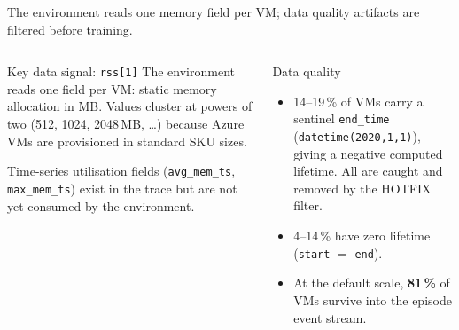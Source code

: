\documentclass[11pt,aspectratio=43]{beamer}
\begin{document}
\begin{frame}{The environment reads one memory field per VM; data quality artifacts are filtered before training.}

  \begin{columns}[T,onlytextwidth]
      \begin{block}{Key data signal: \texttt{rss[1]}}
        The environment reads one field per VM: static memory allocation in MB.
        Values cluster at powers of two (512, 1024, 2048\,MB, \ldots) because
        Azure VMs are provisioned in standard SKU sizes.

        \vspace{0.3em}
        Time-series utilisation fields (\texttt{avg\_mem\_ts}, \texttt{max\_mem\_ts})
        exist in the trace but are not yet consumed by the environment.
      \end{block}
      \begin{block}{Data quality}
        \begin{itemize}
          \item 14--19\,\% of VMs carry a sentinel \texttt{end\_time}
                (\texttt{datetime(2020,1,1)}), giving a negative computed
                lifetime. All are caught and removed by the HOTFIX filter.
          \item 4--14\,\% have zero lifetime (\texttt{start} $=$ \texttt{end}).
          \item At the default scale, \textbf{81\,\%} of VMs survive into the
                episode event stream.
        \end{itemize}
      \end{block}
  \end{columns}

\end{frame}

\end{document}
